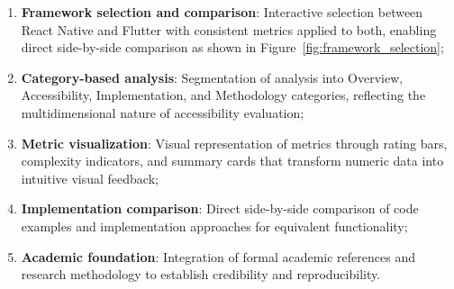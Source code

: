 \begin{enumerate}
    \item \textbf{Framework selection and comparison}: Interactive selection between React Native and Flutter with consistent metrics applied to both, enabling direct side-by-side comparison as shown in Figure~\ref{fig:framework_selection};
    
    \item \textbf{Category-based analysis}: Segmentation of analysis into Overview, Accessibility, Implementation, and Methodology categories, reflecting the multidimensional nature of accessibility evaluation;
    
    \item \textbf{Metric visualization}: Visual representation of metrics through rating bars, complexity indicators, and summary cards that transform numeric data into intuitive visual feedback;
    
    \item \textbf{Implementation comparison}: Direct side-by-side comparison of code examples and implementation approaches for equivalent functionality;
    
    \item \textbf{Academic foundation}: Integration of formal academic references and research methodology to establish credibility and reproducibility.
\end{enumerate}

